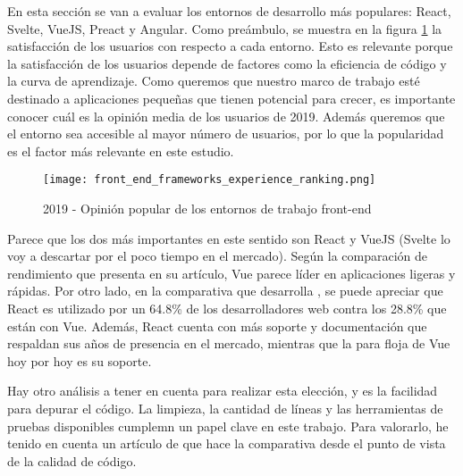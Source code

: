 En esta sección se van a evaluar los entornos de desarrollo más populares: React, Svelte, VueJS, Preact y Angular. Como preámbulo, se muestra en la figura \cref{fig:stjs2019:frontend} la satisfacción de los usuarios con respecto a cada entorno. Esto es relevante porque la satisfacción de los usuarios depende de factores como la eficiencia de código y la curva de aprendizaje. Como queremos que nuestro marco de trabajo esté destinado a aplicaciones pequeñas que tienen potencial para crecer, es importante conocer cuál es la opinión media de los usuarios de 2019. Además queremos que el entorno sea accesible al mayor número de usuarios, por lo que la popularidad es el factor más relevante en este estudio. 

\begin{figure}
	\centering
	\texttt{[image: front\_end\_frameworks\_experience\_ranking.png]}
	\caption{2019 - Opinión popular de los entornos de trabajo front-end}
	\label{fig:stjs2019:frontend}
\end{figure}

Parece que los dos más importantes en este sentido son React y VueJS (Svelte lo voy a descartar por el poco tiempo en el mercado). Según la comparación de rendimiento que presenta \citet{RWC2019} en su artículo, Vue parece líder en aplicaciones ligeras y rápidas. Por otro lado, en la comparativa que desarrolla \citet{TJSF2019}, se puede apreciar que React es utilizado por un 64.8\% de los desarrolladores web contra los 28.8\% que están con Vue. Además, React cuenta con más soporte y documentación que respaldan sus años de presencia en el mercado, mientras que la para floja de Vue hoy por hoy es su soporte.

Hay otro análisis a tener en cuenta para realizar esta elección, y es la facilidad para depurar el código. La limpieza, la cantidad de líneas y las herramientas de pruebas disponibles cumplemn un papel clave en este trabajo. Para valorarlo, he tenido en cuenta un artículo de \citet{RVVCTOG} que hace la comparativa desde el punto de vista de la calidad de código.

